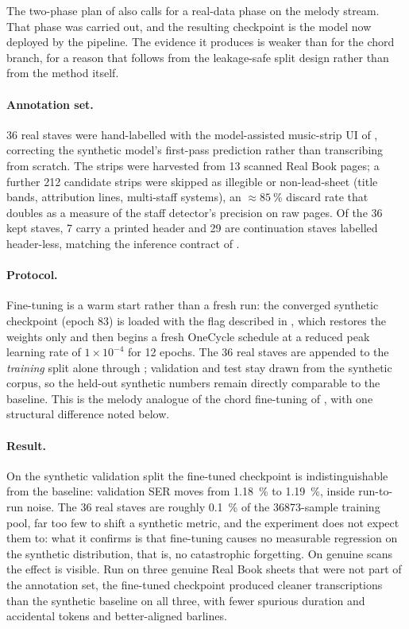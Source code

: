 The two-phase plan of  also calls for a
real-data phase on the melody stream.  That phase was carried out, and
the resulting checkpoint is the model now deployed by the pipeline.  The
evidence it produces is weaker than for the chord branch, for a reason
that follows from the leakage-safe split design rather than from the
method itself.

\paragraph{Annotation set.}
\num{36} real staves were hand-labelled with the model-assisted
music-strip UI of , correcting the synthetic model's
first-pass prediction rather than transcribing from scratch.  The strips
were harvested from \num{13} scanned Real Book pages; a further
\num{212} candidate strips were skipped as illegible or non-lead-sheet
(title bands, attribution lines, multi-staff systems), an
$\approx\SI{85}{\percent}$ discard rate that doubles as a measure of the
staff detector's precision on raw pages.  Of the \num{36} kept staves,
\num{7} carry a printed header and \num{29} are continuation staves
labelled header-less, matching the inference contract of
.

\paragraph{Protocol.}
Fine-tuning is a warm start rather than a fresh run: the converged
synthetic checkpoint (epoch \num{83}) is loaded with the
 flag described in , which
restores the weights only and then begins a fresh OneCycle schedule at a
reduced peak learning rate of $1{\times}10^{-4}$ for \num{12} epochs.
The \num{36} real staves are appended to the \emph{training} split alone
through ; validation and test stay drawn from
the synthetic corpus, so the held-out synthetic numbers remain directly
comparable to the baseline.  This is the melody analogue of the chord
fine-tuning of , with one structural difference noted
below.

\paragraph{Result.}
On the synthetic validation split the fine-tuned checkpoint is
indistinguishable from the baseline: validation SER moves from
\SI{1.18}{\percent} to \SI{1.19}{\percent}, inside run-to-run noise.  The
\num{36} real staves are roughly \SI{0.1}{\percent} of the
\num{36873}-sample training pool, far too few to shift a synthetic
metric, and the experiment does not expect them to: what it confirms is
that fine-tuning causes no measurable regression on the synthetic
distribution, that is, no catastrophic forgetting.  On genuine scans the
effect is visible.  Run on three genuine Real Book sheets that were not part
of the annotation set, the fine-tuned checkpoint produced cleaner
transcriptions than the synthetic baseline on all three, with fewer
spurious duration and accidental tokens and better-aligned barlines.

